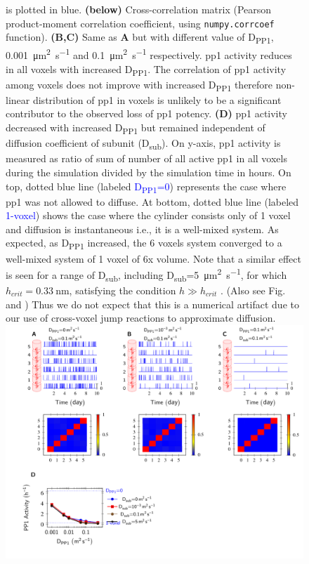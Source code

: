 \documentclass[9pt,lineno,doublespacing]{elife}
\newcommand\SUB[2]{#1\textsubscript{#2}}
\begin{document}
\begin{figure}
{        is plotted in blue. \textbf{(below)} Cross-correlation matrix (Pearson
        product-moment correlation coefficient, using \texttt{numpy.corrcoef}
        function). \textbf{(B,C)} Same as \textbf{A} but with different value of
        \SUB{D}{PP1}, \SI{0.001}{\micro\meter\squared\per\second} and
        \SI{0.1}{\micro\meter\squared\per\second} respectively. \gls{pp1} activity
        reduces in all voxels with increased \SUB{D}{PP1}. The correlation of
        \gls{pp1} activity among voxels does not improve with increased
        \SUB{D}{PP1} therefore non-linear distribution of \gls{pp1} in voxels is
        unlikely to be a significant contributor to the observed loss of \gls{pp1}
        potency. \textbf{(D)} \gls{pp1} activity decreased
        with increased \SUB{D}{PP1} but remained independent of diffusion
        coefficient of subunit (\SUB{D}{sub}). On y-axis, \gls{pp1} activity is measured as ratio
        of sum of number of all active \gls{pp1} in all voxels during the
        simulation divided by the simulation time in hours. On top, dotted blue
        line (labeled \textcolor{blue}{\SUB{D}{PP1}=0}) represents the case where
        \gls{pp1} was not allowed to diffuse. At bottom, dotted blue line
        (labeled \textcolor{blue}{1-voxel}) shows the case where the cylinder
        consists only of 1 voxel and diffusion is instantaneous i.e., it is a
        well-mixed system. As expected, as \SUB{D}{PP1} increased, the 6 voxels system converged to a
        well-mixed system of 1 voxel of 6x volume.
        Note that a similar effect is seen for a range of \SUB{D}{sub},
        including \SUB{D}{sub}=\SI{5}{\micro\meter\squared\per\second}, for
        which $h_{crit}=\SI{0.33}{\nano\meter}$, satisfying the condition \(h\gg h_{crit}\)
        \citep{isaacson_reaction-diffusion_2009}\citep{erban_stochastic_2009}.
        (Also see Fig.  and )
        Thus we do not expect that this is a numerical artifact due to our use
        of cross-voxel jump reactions to approximate diffusion. 
}{\includegraphics[width=\linewidth]{./PaperFigures/suppl/figure_pp1_profile.pdf}}
\label{figsupp:diffusion_reduces_pp1_potency}
\end{figure}
\end{document}
